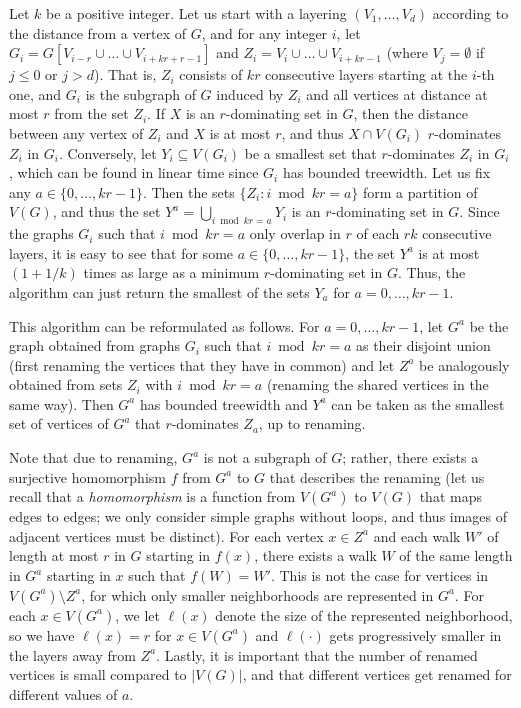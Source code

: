 \documentclass[a4paper,11pt]{article}
\begin{document}
Let $k$ be a positive integer.  Let us start with a layering $(V_1,\ldots,V_d)$ according to the distance from a vertex of $G$,
and for any integer $i$, let $G_i=G[V_{i-r}\cup \ldots\cup V_{i+kr+r-1}]$ and $Z_i=V_i\cup \ldots\cup V_{i+kr-1}$
(where $V_j=\emptyset$ if $j\le 0$ or $j>d$).   That is, $Z_i$ consists of $kr$ consecutive layers starting at the $i$-th one,
and $G_i$ is the subgraph of $G$ induced by $Z_i$ and all vertices
at distance at most $r$ from the set $Z_i$.  If $X$ is an $r$-dominating set in $G$, then the distance between any vertex of $Z_i$
and $X$ is at most $r$, and thus $X\cap V(G_i)$ $r$-dominates $Z_i$ in $G_i$.  Conversely,
let $Y_i\subseteq V(G_i)$ be a smallest set that $r$-dominates $Z_i$ in $G_i$,
which can be found in linear time since $G_i$ has bounded treewidth.
Let us fix any $a\in\{0,\ldots, kr-1\}$.  Then the sets $\{Z_i:i\bmod kr=a\}$ form a partition of $V(G)$,
and thus the set $Y^a=\bigcup_{i\bmod kr=a} Y_i$ is an $r$-dominating set in $G$.
Since the graphs $G_i$ such that $i \bmod kr=a$ only overlap in $r$ of each $rk$ consecutive layers,
it is easy to see that for some $a\in \{0,\ldots, kr-1\}$, the set $Y^a$ is at most $(1+1/k)$ times as large as a
minimum $r$-dominating set in $G$.  Thus, the algorithm can just return the smallest of the sets $Y_a$ for $a=0,\ldots, kr-1$.

This algorithm can be reformulated as follows.  For $a=0,\ldots,kr-1$, let $G^a$ be the graph obtained from graphs $G_i$ such that
$i\bmod kr=a$ as their disjoint union (first renaming the vertices that they have in common) and let $Z^a$ be analogously
obtained from sets $Z_i$ with $i\bmod kr=a$ (renaming the shared vertices in the same way).  Then $G^a$ has bounded
treewidth and $Y^a$ can be taken as the smallest set of vertices of $G^a$ that $r$-dominates $Z_a$, up to renaming.

Note that due to renaming, $G^a$ is not a subgraph of $G$; rather, there exists a surjective homomorphism $f$ from $G^a$ to $G$
that describes the renaming (let us recall that a \emph{homomorphism} is a function from $V(G^a)$ to $V(G)$ that maps edges to edges;
we only consider simple graphs without loops, and thus images of adjacent vertices must be distinct).
For each vertex $x\in Z^a$ and each walk $W'$ of length at most $r$ in $G$ starting in $f(x)$, there exists a walk $W$
of the same length in $G^a$ starting in $x$ such that $f(W)=W'$.  This is not the case for vertices in $V(G^a)\setminus Z^a$,
for which only smaller neighborhoods are represented in $G^a$. For each $x\in V(G^a)$, we let $\ell(x)$ denote the size
of the represented neighborhood, so we have $\ell(x)=r$ for $x\in V(G^a)$ and $\ell(\cdot)$ gets progressively smaller
in the layers away from $Z^a$.  Lastly, it is important that the number of renamed vertices is small compared to $|V(G)|$,
and that different vertices get renamed for different values of $a$.
\end{document}
